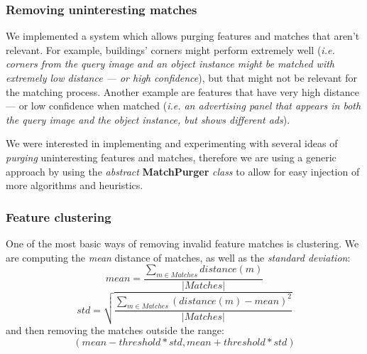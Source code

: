 \documentclass[a4paper,onecolumn,oneside,titlepage,11pt]{report}
\begin{document}
\subsubsection{Removing uninteresting matches}
We implemented a system which allows purging features and matches that aren't relevant. For example, buildings' corners might perform extremely well (\emph{i.e. corners from the query image and an object instance might be matched with extremely low distance --- or high confidence}), but that might not be relevant for the matching process. Another example are features that have very high distance --- or low confidence when matched (\emph{i.e. an advertising panel that appears in both the query image and the object instance, but shows different ads}).

We were interested in implementing and experimenting with several ideas of \emph{purging} uninteresting features and matches, therefore we are using a generic approach by using the \emph{abstract} \textbf{MatchPurger} \emph{class} to allow for easy injection of more algorithms and heuristics.

\subsubsection{Feature clustering}
One of the most basic ways of removing invalid feature matches is clustering. We are computing the \emph{mean} distance of matches, as well as the \emph{standard deviation}:
$$
mean = \frac{\sum_{m \in Matches}distance(m)}{|Matches|}
$$
$$
std = \sqrt{\frac{\sum_{m \in Matches} (distance(m) - mean)^2}{|Matches|}}
$$
and then removing the matches outside the range:
$$
(mean - threshold * std, mean + threshold * std)
$$
\end{document}
